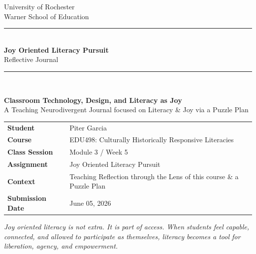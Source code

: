 \documentclass[11pt]{article}
\begin{document}
\begin{titlepage}
\thispagestyle{empty}

\begin{center}
    \vspace*{0.25in}
    {\large University of Rochester\\}
    {\normalsize Warner School of Education\\[0.35in]}

    {\color{PrimaryRed}\rule{\textwidth}{1.4pt}}\\[0.22in]
    {\Huge\bfseries Joy Oriented Literacy Pursuit\\[0.12in]}
    {\Large Reflective Journal\\[0.22in]}
    {\color{PrimaryRed}\rule{0.72\textwidth}{0.7pt}}\\[0.32in]

    \colorbox{SoftBlue}{%
        \parbox{0.86\textwidth}{%
            \centering\vspace{0.12in}
            \textbf{Classroom Technology, Design, and Literacy as Joy}\\[0.05in]
            A Teaching Neurodivergent Journal focused on Literacy \& Joy via a Puzzle Plan
            \vspace{0.12in}
        }%
    }
\end{center}

\vspace{0.4in}

\begin{center}
\renewcommand{\arraystretch}{1.35}
\begin{tabular}{>{\bfseries\RaggedLeft}p{1.55in} p{4.85in}}
Student & Piter Garcia \\
Course & EDU498: Culturally Historically Responsive Literacies \\
Class Session & Module 3 / Week 5 \\
Assignment & Joy Oriented Literacy Pursuit \\
Context & Teaching Reflection through the Lens of this course \& a Puzzle Plan\\
Submission Date & June 05, 2026 \\
\end{tabular}
\end{center}

\vspace{0.4in}

\begin{center}
\begin{minipage}{0.86\textwidth}
\itshape
Joy oriented literacy is not extra. It is part of access. When students feel capable, connected, and allowed to participate as themselves, literacy becomes a tool for liberation, agency, and empowerment.


\end{minipage}
\end{center}
\end{titlepage}
\end{document}
